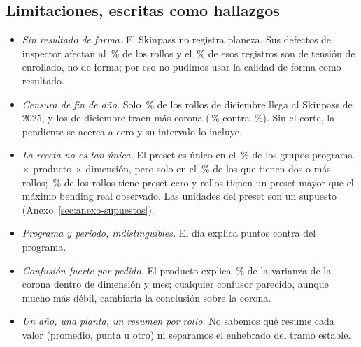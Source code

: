 \subsection{Limitaciones, escritas como hallazgos}
\begin{itemize}
\item \emph{Sin resultado de forma.} El Skinpass no registra planeza. Sus defectos de inspector afectan al
      \PctDefInspector\,\% de los rollos y el \PctTensionEnrollado\,\% de esos registros son de tensión de enrollado, no
      de forma; por eso no pudimos usar la calidad de forma como resultado.
\item \emph{Censura de fin de año.} Solo \PctDicEnSKP\,\% de los rollos de diciembre llega al Skinpass de 2025, y los de
      diciembre traen más corona (\CoronaRelMedianaDic\,\% contra \CoronaRelMediana\,\%). Sin el corte, la pendiente se
      acerca a cero y su intervalo lo incluye.
\item \emph{La receta no es tan única.} El preset es único en el \PctPresetUnicoTodos\,\% de los grupos programa
      $\times$ producto $\times$ dimensión, pero solo en el \PctPresetUnicoDos\,\% de los que tienen dos o más rollos;
      \PctPresetCero\,\% de los rollos tiene preset cero y \NPresetAlto{} rollos tienen un preset mayor que el máximo
      bending real observado. Las unidades del preset son un supuesto (Anexo~\ref{sec:anexo-supuestos}).
\item \emph{Programa y periodo, indistinguibles.} El día explica \VCuatroExcesoDia{} puntos contra
      \VCuatroExcesoProg{} del programa.
\item \emph{Confusión fuerte por pedido.} El producto explica \CHRDRef\,\% de la varianza de la corona dentro de
      dimensión y mes; cualquier confusor parecido, aunque mucho más débil, cambiaría la conclusión sobre la corona.
\item \emph{Un año, una planta, un resumen por rollo.} No sabemos qué resume cada valor (promedio, punta u otro) ni
      separamos el enhebrado del tramo estable.
\end{itemize}
